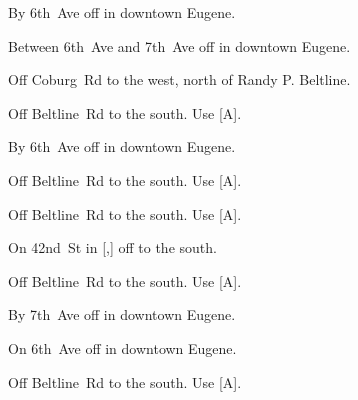 

\begin{LocationList}

By 6th~Ave off  in downtown Eugene.

Between 6th~Ave and  7th~Ave off  in downtown Eugene.

Off Coburg~Rd to the west, north of  Randy P. Beltline.

Off Beltline~Rd to the south.
Use  [A].

By 6th~Ave off  in downtown Eugene.

\Location{\GarageHQ \Garage}
Off Beltline~Rd to the south.
Use  [A].

\Location{\GasStation \Gas}
Off Beltline~Rd to the south.
Use  [A].

On 42nd~St in [,] off   to the south.

\Location{\RecruitmentAgency \Recruitment}
Off Beltline~Rd to the south.
Use  [A].

By  7th~Ave off  in downtown Eugene.

On 6th~Ave off  in downtown Eugene.

Off Beltline~Rd to the south.
Use  [A].

\end{LocationList}
